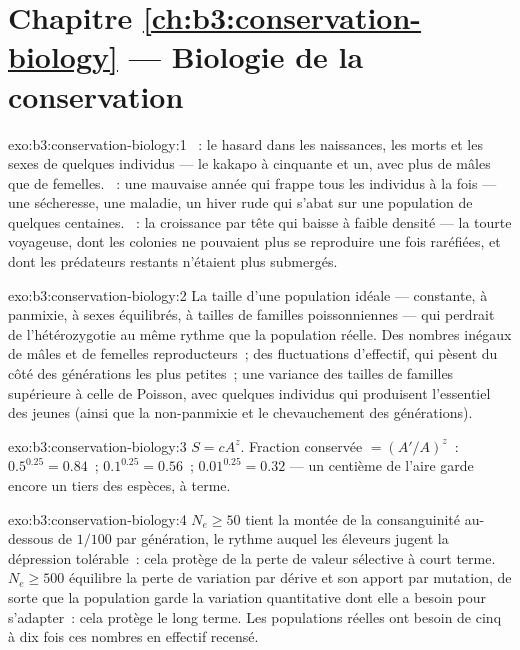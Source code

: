 \section*{Chapitre \ref{ch:b3:conservation-biology} --- Biologie de la conservation}

\begin{solution}{exo:b3:conservation-biology:1}
~: le hasard dans les naissances, les morts
et les sexes de quelques individus --- le kakapo à cinquante et un, avec
plus de mâles que de femelles. ~: une
mauvaise année qui frappe tous les individus à la fois --- une
sécheresse, une maladie, un hiver rude qui s'abat sur une population de
quelques centaines. ~: la croissance par tête qui baisse à
faible densité --- la tourte voyageuse, dont les colonies ne pouvaient
plus se reproduire une fois raréfiées, et dont les prédateurs restants
n'étaient plus submergés.
\end{solution}

\begin{solution}{exo:b3:conservation-biology:2}
La taille d'une population idéale --- constante, à panmixie, à sexes
équilibrés, à tailles de familles poissonniennes --- qui perdrait de
l'hétérozygotie au même rythme que la population réelle. Des nombres
inégaux de mâles et de femelles reproducteurs~; des fluctuations
d'effectif, qui pèsent du côté des générations les plus petites~; une
variance des tailles de familles supérieure à celle de Poisson, avec
quelques individus qui produisent l'essentiel des jeunes (ainsi que la
non-panmixie et le chevauchement des générations).
\end{solution}

\begin{solution}{exo:b3:conservation-biology:3}
$S = cA^{z}$. Fraction conservée $= (A'/A)^{z}$~: $0.5^{0.25} = 0.84$~;
$0.1^{0.25} = 0.56$~; $0.01^{0.25} = 0.32$ --- un centième de l'aire
garde encore un tiers des espèces, à terme.
\end{solution}

\begin{solution}{exo:b3:conservation-biology:4}
$N_{e} \ge 50$ tient la montée de la consanguinité au-dessous de $1/100$
par génération, le rythme auquel les éleveurs jugent la dépression
tolérable~: cela protège de la perte de valeur sélective à court terme.
$N_{e} \ge
500$ équilibre la perte de variation par dérive et son apport par
mutation, de sorte que la population garde la variation quantitative
dont elle a besoin pour s'adapter~: cela protège le long terme. Les
populations réelles ont besoin de cinq à dix fois ces nombres en
effectif recensé.
\end{solution}

